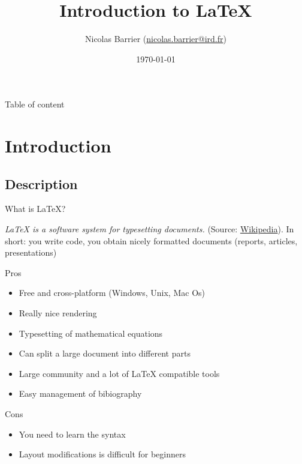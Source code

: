 \documentclass[10pt]{beamer}
\author{Nicolas Barrier (\href{mailto:nicolas.barrier@ird.fr}{nicolas.barrier@ird.fr})}
\title{Introduction to \LaTeX}
\institute{
    UMR MARBEC
}
\date{\today}
\begin{document}
\lstset{style=mytex}

\frame{\titlepage}

\begin{frame}{Table of content}
\tableofcontents[hideallsubsections]
\end{frame}




\section{Introduction}
\subsection{Description}

\begin{frame}{What is \LaTeX{}?}

\emph{\LaTeX{} is a software system for typesetting documents.} (Source: \href{https://en.wikipedia.org/wiki/LaTeX}{Wikipedia}). In short: you write code, you obtain nicely formatted documents (reports, articles, presentations) \\

\begin{block}{Pros}
\begin{itemize}
\item{Free and cross-platform (Windows, Unix, Mac Os)}
\item{Really nice rendering}
\item{Typesetting of mathematical equations}
\item{Can split a large document into different parts}
\item{Large community and a lot of \LaTeX{} compatible tools}
\item{Easy management of bibiography}
\end{itemize}
\end{block}

\begin{alertblock}{Cons}
\begin{itemize}
\item{You need to learn the syntax}
\item{Layout modifications is difficult for beginners}
\end{itemize}

\end{alertblock}

\end{frame}
\end{document}

